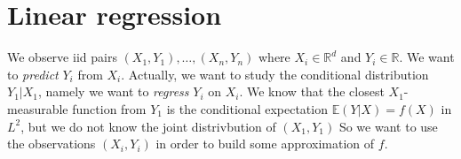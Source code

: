 \documentclass[
	fontsize=11pt, %
	twoside=false, %
	numbers=noenddot, %
]{kaobook}
\newcommand{\E}{\mathbb E}
\newcommand{\R}{\mathbb R}
\begin{document}









\mainmatter %


% 

% 

% 


\setchapterpreamble[u]{\margintoc}
\chapter{Linear regression}
\label{chap:linear_regression}

We observe iid pairs $(X_1, Y_1), \ldots, (X_n, Y_n)$ where $X_i \in \R^d$ and $Y_i \in \R$.
We want to \emph{predict} $Y_i$ from $X_i$.
Actually, we want to study the conditional distribution $Y_1 | X_1$, namely we want to \emph{regress} $Y_i$ on $X_i$.
We know that the closest $X_1$-measurable function from $Y_1$ is the conditional expectation $\E (Y | X) = f(X)$  in $L^2$, but we do not know the joint distrivbution of $(X_1, Y_1)$
So we want to use the observations $(X_i, Y_i)$ in order to build some approximation of $f$.
\end{document}
